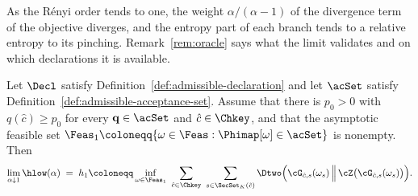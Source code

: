 
As the R\'enyi order tends to one, the weight $\alpha/(\alpha-1)$ of the
divergence term of the objective diverges, and the entropy part of each
branch tends to a relative entropy to its pinching. Remark~\ref{rem:oracle} says what the
limit validates and on which declarations it is available.

\begin{theorem}\label{thm:oracle}
Let $\Decl$ satisfy Definition~\ref{def:admissible-declaration} and let
$\acSet$ satisfy Definition~\ref{def:admissible-acceptance-set}. Assume that
there is $p_0>0$ with $q(\hat c)\ge p_0$ for every $\mathbf q\in\acSet$ and
$\hat c\in\Chkey$, and that the asymptotic feasible set
$\Feas_1\coloneqq\{\omega\in\Feas:\Phimap[\omega]\in\acSet\}$ is
nonempty. Then
\begin{equation}\label{eq:oracle}
  \lim_{\alpha\downarrow1}\hlow(\alpha)
  \;=\;h_1\coloneqq
  \inf_{\omega\in\Feas_1}\ \sum_{\hat c\in\Chkey}\
  \sum_{s\in\SecSet_K(\hat c)}
  \Dtwo\Big(\cG_{\hat c,s}(\omega_s)\,\Big\|\,
  \cZ\big(\cG_{\hat c,s}(\omega_s)\big)\Big).
\end{equation}
\end{theorem}

